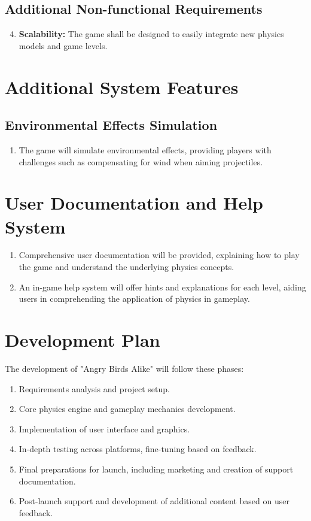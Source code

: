 \documentclass[12pt]{article}
\begin{document}
\subsection{Additional Non-functional Requirements}
\begin{enumerate}
    \setcounter{enumi}{3}
    \item \textbf{Scalability:} The game shall be designed to easily integrate new physics models and game levels.
\end{enumerate}

\section{Additional System Features}
\subsection{Environmental Effects Simulation}
\begin{enumerate}
    \item The game will simulate environmental effects, providing players with challenges such as compensating for wind when aiming projectiles.
\end{enumerate}

\section{User Documentation and Help System}
\begin{enumerate}
    \item Comprehensive user documentation will be provided, explaining how to play the game and understand the underlying physics concepts.
    \item An in-game help system will offer hints and explanations for each level, aiding users in comprehending the application of physics in gameplay.
\end{enumerate}

\section{Development Plan}
The development of "Angry Birds Alike" will follow these phases:
\begin{enumerate}
    \item Requirements analysis and project setup.
    \item Core physics engine and gameplay mechanics development.
    \item Implementation of user interface and graphics.
    \item In-depth testing across platforms, fine-tuning based on feedback.
    \item Final preparations for launch, including marketing and creation of support documentation.
    \item Post-launch support and development of additional content based on user feedback.
\end{enumerate}
\end{document}

